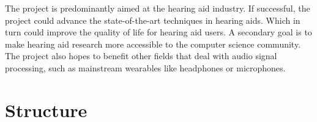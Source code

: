 \documentclass[logo,bsc,singlespacing,parskip,online]{infthesis}
\begin{document}
The project is predominantly aimed at the hearing aid industry. If successful, the project
could advance the state-of-the-art techniques in hearing aids.
Which in turn could improve the quality of life for hearing aid users.
A secondary goal is to make hearing aid research more accessible to the 
computer science community.
The project also hopes to benefit other fields that deal with audio signal processing,
such as mainstream wearables like headphones or microphones.



\section{Structure}
 
\end{document}
